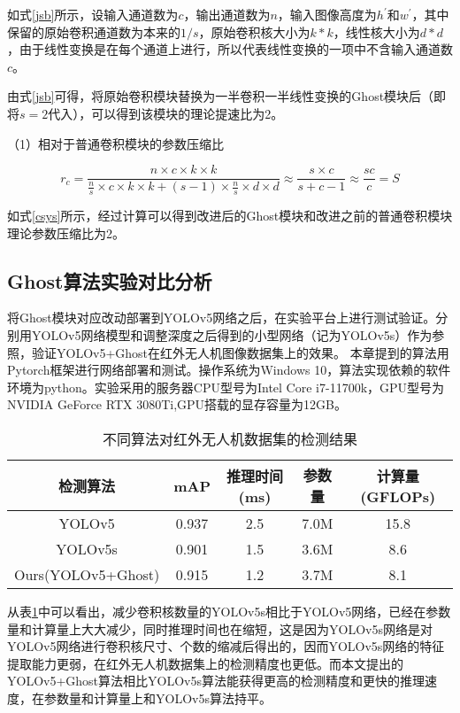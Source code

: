 如式\ref{jsb}所示，设输入通道数为$c$，输出通道数为$n$，输入图像高度为$h^{\prime}$和$w^{\prime}$，其中保留的原始卷积通道数为本来的$1/s$，原始卷积核大小为$k*k$，线性核大小为$d*d$，由于线性变换是在每个通道上进行，所以代表线性变换的一项中不含输入通道数$c$。

由式\ref{jsb}可得，将原始卷积模块替换为一半卷积一半线性变换的Ghost模块后（即将$s=2$代入），可以得到该模块的理论提速比为2。

（1）相对于普通卷积模块的参数压缩比

\begin{equation}
    r_{c}=\frac{n \times c \times k \times k}{\frac{n}{s} \times c \times k \times k+(s-1) \times \frac{n}{s} \times d \times d} \approx \frac{s \times c}{s+c-1} \approx \frac{s c}{c}=S
    \label{csys}
\end{equation}

如式\ref{csys}所示，经过计算可以得到改进后的Ghost模块和改进之前的普通卷积模块理论参数压缩比为2。

\subsection{Ghost算法实验对比分析}
将Ghost模块对应改动部署到YOLOv5网络之后，在实验平台上进行测试验证。分别用YOLOv5网络模型和调整深度之后得到的小型网络（记为YOLOv5s）作为参照，验证YOLOv5+Ghost在红外无人机图像数据集上的效果。
本章提到的算法用Pytorch框架进行网络部署和测试。操作系统为Windows 10，算法实现依赖的软件环境为python。实验采用的服务器CPU型号为Intel Core i7-11700k，GPU型号为NVIDIA GeForce RTX 3080Ti,GPU搭载的显存容量为12GB。

\begin{table}[htbp]
    \caption{不同算法对红外无人机数据集的检测结果}
    \vspace{0.5em}\centering\wuhao
    \begin{tabular}{ccccc}
    \toprule
    检测算法 & mAP & 推理时间(ms) & 参数量 & 计算量(GFLOPs)\\
    \midrule
    YOLOv5 & 0.937 & 2.5 & 7.0M & 15.8\\
    YOLOv5s & 0.901 & 1.5 & 3.6M & 8.6\\
    Ours(YOLOv5+Ghost)& 0.915 & 1.2 & 3.7M & 8.1\\
    \bottomrule
    \end{tabular}
    \label{t22}
\end{table}

从表\ref{t22}中可以看出，减少卷积核数量的YOLOv5s相比于YOLOv5网络，已经在参数量和计算量上大大减少，同时推理时间也在缩短，这是因为YOLOv5s网络是对YOLOv5网络进行卷积核尺寸、个数的缩减后得出的，因而YOLOv5s网络的特征提取能力更弱，在红外无人机数据集上的检测精度也更低。而本文提出的YOLOv5+Ghost算法相比YOLOv5s算法能获得更高的检测精度和更快的推理速度，在参数量和计算量上和YOLOv5s算法持平。

